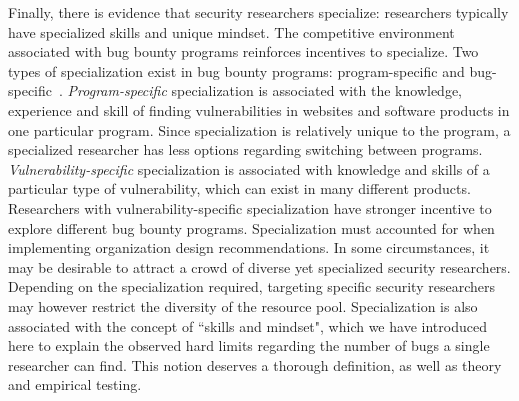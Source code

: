 Finally, there is evidence that security researchers specialize: researchers typically have specialized skills and unique mindset. The competitive environment associated with bug bounty programs reinforces incentives to specialize. Two types of specialization exist in bug bounty programs: program-specific and bug-specific~\cite{zhao2014exploratory,zhao2015empirical}. \textit{Program-specific} specialization is associated with the knowledge, experience and skill of finding vulnerabilities in websites and software products in one particular program. Since specialization is relatively unique to the program, a specialized researcher has less options regarding switching between programs. \textit{Vulnerability-specific} specialization is associated with knowledge and skills of a particular type of vulnerability, which can exist in many different products. Researchers with vulnerability-specific specialization have stronger incentive to explore different bug bounty programs. Specialization must accounted for when implementing organization design recommendations. In some circumstances, it may be desirable to attract a crowd of diverse yet specialized security researchers. Depending on the specialization required, targeting specific security researchers may however restrict the diversity of the resource pool. Specialization is also associated with the concept of ``skills and mindset", which we have introduced here to explain the observed hard limits regarding the number of bugs a single researcher can find. This notion deserves a thorough definition, as well as theory and empirical testing. \\





